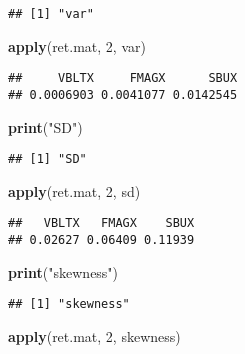\documentclass[]{article}
\newenvironment{Shaded}{\begin{snugshade}}{\end{snugshade}}
\newcommand{\KeywordTok}[1]{\textcolor[rgb]{0.13,0.29,0.53}{\textbf{#1}}}
\newcommand{\DecValTok}[1]{\textcolor[rgb]{0.00,0.00,0.81}{#1}}
\newcommand{\StringTok}[1]{\textcolor[rgb]{0.31,0.60,0.02}{#1}}
\newcommand{\NormalTok}[1]{#1}
\begin{document}
\begin{verbatim}
## [1] "var"
\end{verbatim}

\begin{Shaded}
\begin{Highlighting}[]
\KeywordTok{apply}\NormalTok{(ret.mat, }\DecValTok{2}\NormalTok{, var)}
\end{Highlighting}
\end{Shaded}

\begin{verbatim}
##     VBLTX     FMAGX      SBUX 
## 0.0006903 0.0041077 0.0142545
\end{verbatim}

\begin{Shaded}
\begin{Highlighting}[]
\KeywordTok{print}\NormalTok{(}\StringTok{"SD"}\NormalTok{)}
\end{Highlighting}
\end{Shaded}

\begin{verbatim}
## [1] "SD"
\end{verbatim}

\begin{Shaded}
\begin{Highlighting}[]
\KeywordTok{apply}\NormalTok{(ret.mat, }\DecValTok{2}\NormalTok{, sd)}
\end{Highlighting}
\end{Shaded}

\begin{verbatim}
##   VBLTX   FMAGX    SBUX 
## 0.02627 0.06409 0.11939
\end{verbatim}

\begin{Shaded}
\begin{Highlighting}[]
\KeywordTok{print}\NormalTok{(}\StringTok{"skewness"}\NormalTok{)}
\end{Highlighting}
\end{Shaded}

\begin{verbatim}
## [1] "skewness"
\end{verbatim}

\begin{Shaded}
\begin{Highlighting}[]
\KeywordTok{apply}\NormalTok{(ret.mat, }\DecValTok{2}\NormalTok{, skewness)}
\end{Highlighting}
\end{Shaded}
\end{document}
